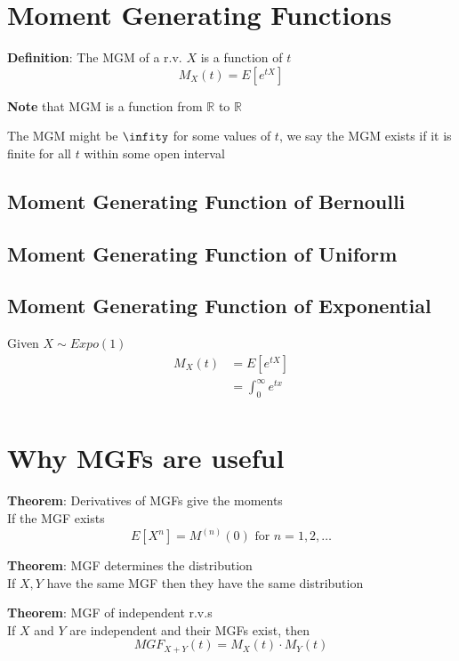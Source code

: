 \section{Moment Generating Functions}
\begin{framed}
   \textbf{Definition}: The MGM of a r.v. $X$ is a function of $t$
   \[
      M_X(t) = E \left[ e^{tX} \right]
   \] 

   \textbf{Note} that MGM is a function from $\mathbb{R}$ to $\mathbb{R}$

   The MGM might be $\infity$ for some values of $t$, we say the MGM exists if it is finite for all $t$ within some open interval
\end{framed}

\subsection{Moment Generating Function of Bernoulli}
\subsection{Moment Generating Function of Uniform}
\subsection{Moment Generating Function of Exponential}

Given $X \sim Expo(1)$
\begin{align*}
   M_X(t) &= E\left[ e^{tX} \right]  \\
          &= \int_{0}^{\infty}  e^{tx} \\
\end{align*}

\section{Why MGFs are useful}
\begin{framed}
   \textbf{Theorem}: Derivatives of MGFs give the moments \\

   If the MGF exists
   \[
      E[X^n] = M^{(n)} (0) \text{ for } n = 1, 2, \hdots
   \] 
  
\end{framed}

\begin{framed}
   \textbf{Theorem}: MGF determines the distribution\\
   If $X, Y$ have the same MGF then they have the same distribution
\end{framed}
\begin{framed}
   \textbf{Theorem}: MGF of independent r.v.s\\

   If $X$ and $Y$ are independent and their MGFs exist, then 
   \[
      MGF_{X + Y}(t)  =  M_X(t) \cdot M_Y(t)
   \] 
\end{framed}
